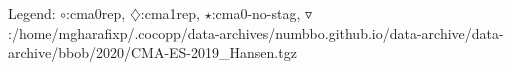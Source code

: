 Legend: {\color{NavyBlue}$\circ$}:cma0rep, {\color{Magenta}$\diamondsuit$}:cma1rep, {\color{Orange}$\star$}:cma0-no-stag, {\color{CornflowerBlue}$\triangledown$}:/home/mgharafixp/.cocopp/data-archives/numbbo.github.io/data-archive/data-archive/bbob/2020/CMA-ES-2019\_Hansen.tgz